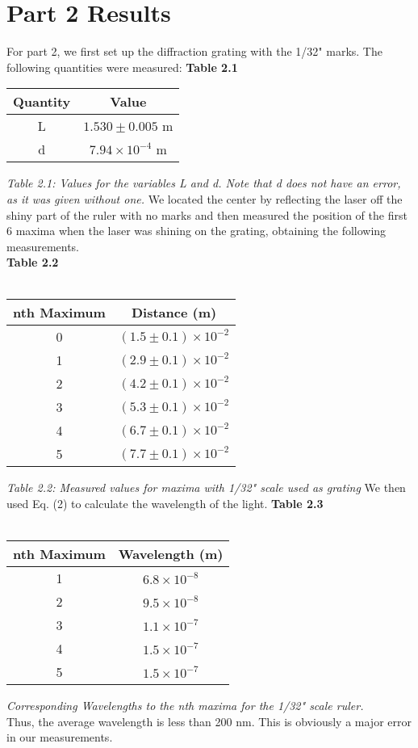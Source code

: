 \documentclass[leqno]{article}
\begin{document}
\section*{Part 2 Results}
For part 2, we first set up the diffraction grating with the 1/32" marks.
The following quantities were measured:
\textbf{Table 2.1}
\begin{tabular}{c|c}
	Quantity & Value\\
	\hline
	L & $1.530\pm0.005$ m\\
	d & $7.94\times10^{-4}$ m
\end{tabular}
\textit{\small Table 2.1: Values for the variables L and d.  Note that d does not have an error, as it was given without one.}
We located the center by reflecting the laser off the shiny part of the ruler with no marks and then measured the position of the first 6 maxima when the laser was shining on the grating, obtaining the following measurements.\\
\textbf{Table 2.2}\\\\
\begin{tabular}{|c|c|}
	\hline
	nth Maximum & Distance (m)\\
	\hline
	0 & $(1.5\pm0.1) \times 10^{-2}$\\
	\hline
	1 & $(2.9\pm0.1)\times 10^{-2}$\\ 
	\hline
	2 & $(4.2\pm0.1)\times 10^{-2}$\\ 
	\hline
	3 & $(5.3\pm0.1)\times 10^{-2}$\\ 
	\hline
	4 & $(6.7\pm0.1)\times 10^{-2}$\\ 
	\hline
	5 & $(7.7\pm0.1)\times 10^{-2}$\\
	\hline
\end{tabular}
\textit{\small Table 2.2: Measured values for maxima with 1/32" scale used as grating}
We then used Eq. (2) to calculate the wavelength of the light.
\textbf{Table 2.3}\\\\
\begin{tabular}{|c|c|}
	\hline
	nth Maximum & Wavelength (m)\\
	\hline
	1 & $6.8\times 10^{-8}$\\ 
	\hline
	2 & $9.5\times 10^{-8}$\\ 
	\hline
	3 & $1.1\times 10^{-7}$\\ 
	\hline
	4 & $1.5\times 10^{-7}$\\ 
	\hline
	5 & $1.5\times 10^{-7}$\\
	\hline
\end{tabular}
\textit{\small Corresponding Wavelengths to the nth maxima for the 1/32" scale ruler.}\\
Thus, the average wavelength is less than 200 nm.  This is obviously a major error in our measurements.\\
\end{document}
